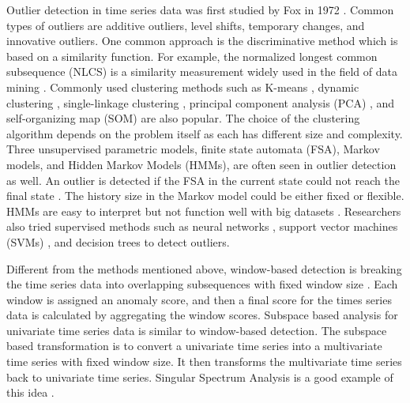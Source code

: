 Outlier detection in time series data was first studied by Fox in 1972 \cite{fox1972outliers}. Common types of outliers are additive outliers, level shifts, temporary changes, and innovative outliers. One common approach is the discriminative method which is based on a similarity function. For example, the normalized longest common subsequence (NLCS) is a similarity measurement widely used in the field of data mining \cite{budalakoti2009anomaly, chandola2008comparative, sequeira2002admit}. Commonly used clustering methods such as K-means \cite{macqueen1967some}, dynamic clustering \cite{sequeira2002admit}, single-linkage clustering \cite{portnoy2001intrusion}, principal component analysis (PCA) \cite{gupta2013context}, and self-organizing map (SOM) \cite{gonzalez2003anomaly} are also popular. The choice of the clustering algorithm depends on the problem itself as each has different size and complexity. Three unsupervised parametric models, finite state automata (FSA), Markov models, and Hidden Markov Models (HMMs), are often seen in outlier detection as well. An outlier is detected if the FSA in the current state could not reach the final state \cite{chandola2008comparative}. The history size in the Markov model could be either fixed or flexible. HMMs are easy to interpret but not function well with big datasets \cite{chandola2008comparative}. Researchers also tried supervised methods such as neural networks \cite{dasgupta2000comparison}, support vector machines (SVMs) \cite{li2006motion}, and decision trees \cite{kang2005learning} to detect outliers.

Different from the methods mentioned above, window-based detection is breaking the time series data into overlapping subsequences with fixed window size \cite{cheboli2010anomaly}. Each window is assigned an anomaly score, and then a final score for the times series data is calculated by aggregating the window scores. Subspace based analysis for univariate time series data is similar to window-based detection. The subspace based transformation is to convert a univariate time series into a multivariate time series with fixed window size. It then transforms the multivariate time series back to univariate time series. Singular Spectrum Analysis is a good example of this idea \cite{golyandina2013singular}.

